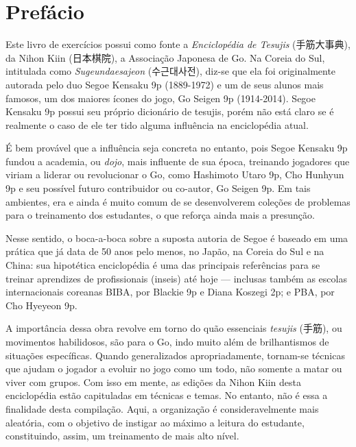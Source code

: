 \chapter{Prefácio}

\fontsize{16}{16}\selectfont

Este livro de exercícios possui como fonte a \textit{Enciclopédia de Tesujis} (手筋大事典), da Nihon Kiin (\hspace*{-0.05cm}日\hspace*{-0.075cm}本棋院\hspace{0.025cm}), a Associação Japonesa de Go. Na Coreia do Sul, intitulada como \textit{Sugeundaesajeon} ({\hangul 수근대사전}), diz-se que ela foi originalmente autorada pelo duo Segoe Kensaku 9p (1889-1972) e um de seus alunos mais famosos, um dos maiores ícones do jogo, Go Seigen 9p (1914-2014). Segoe Kensaku 9p possui seu próprio dicionário de tesujis, porém não está claro se é realmente o caso de ele ter tido alguma influência na enciclopédia atual.

É bem provável que a influência seja concreta no entanto, pois Segoe Kensaku 9p fundou a academia, ou \textit{dojo}, mais influente de sua época, treinando jogadores que viriam a liderar ou revolucionar o Go, como Hashimoto Utaro 9p, Cho Hunhyun 9p e seu possível futuro contribuidor ou co-autor, Go Seigen 9p. Em tais ambientes, era e ainda é muito comum de se desenvolverem coleções de problemas para o treinamento dos estudantes, o que reforça ainda mais a presunção.

Nesse sentido, o boca-a-boca sobre a suposta autoria de Segoe é baseado em uma prática que já data de 50 anos pelo menos, no Japão, na Coreia do Sul e na China: sua hipotética enciclopédia é uma das principais referências para se treinar aprendizes de profissionais (inseis) até hoje --- inclusas também as escolas internacionais coreanas BIBA, por Blackie 9p e Diana Koszegi 2p; e PBA, por Cho Hyeyeon 9p.

A importância dessa obra revolve em torno do quão essenciais \textit{tesujis} (手筋), ou movimentos habilidosos, são para o Go, indo muito além de brilhantismos de situações específicas. Quando generalizados apropriadamente, tornam-se técnicas que ajudam o jogador a evoluir no jogo como um todo, não somente a matar ou viver com grupos. Com isso em mente, as edições da Nihon Kiin desta enciclopédia estão capituladas em técnicas e temas. No entanto, não é essa a finalidade desta compilação. Aqui, a organização é consideravelmente mais aleatória, com o objetivo de instigar ao máximo a leitura do estudante, constituindo, assim, um treinamento de mais alto nível.

